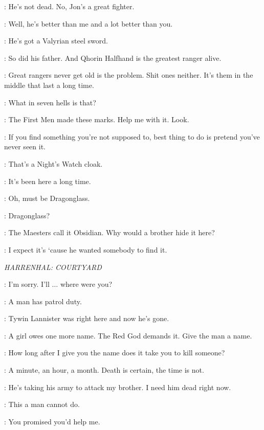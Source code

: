 \SAM: He's not dead. No, Jon's a great fighter. 

\GRENN: Well, he's better than me and a lot better than you. 

\SAM: He's got a Valyrian steel sword. 

\GRENN: So did his father. And Qhorin Halfhand is the greatest ranger alive. 

\EDD: Great rangers never get old is the problem. Shit ones neither. It's them in the middle that last a long time. 


\GRENN: What in seven hells is that? 


\SAM: The First Men made these marks. Help me with it.  Look. 

\GRENN: If you find something you're not supposed to, best thing to do is pretend you've never seen it. 

\SAM: That's a Night's Watch cloak. 

\GRENN: It's been here a long time. 

\SAM: Oh, must be Dragonglass. 

\GRENN: Dragonglass? 

\SAM: The Maesters call it Obsidian. Why would a brother hide it here? 

\EDD: I expect it's `cause he wanted somebody to find it. 


\scene

\textit{HARRENHAL: COURTYARD} 


\ARYA: I'm sorry. I'll $\ldots$ where were you? 

\JAQEN: A man has patrol duty. 

\ARYA: Tywin Lannister was right here and now he's gone. 

\JAQEN: A girl owes one more name. The Red God demands it. Give the man a name. 

\ARYA: How long after I give you the name does it take you to kill someone? 

\JAQEN: A minute, an hour, a month. Death is certain, the time is not. 

\ARYA: He's taking his army to attack my brother. I need him dead right now. 

\JAQEN: This a man cannot do. 

\ARYA: You promised you'd help me. 

